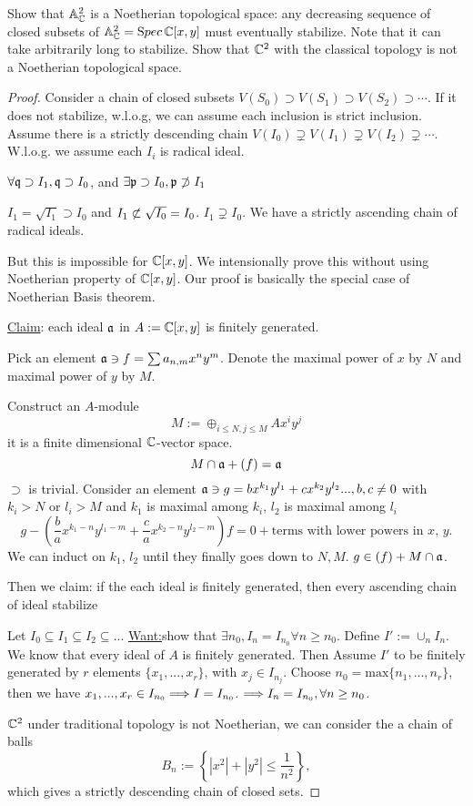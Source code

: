 \documentclass[11pt,fleqn]{book}
\begin{document}
\begin{exr}
Show that $\mathbb A^2_\mathbb C$ is a Noetherian topological space: any decreasing sequence of closed subsets of $\mathbb A^2_\mathbb C = {\text Spec\,} \mathbb C[x, y]$ must eventually stabilize. Note that it can take arbitrarily long to stabilize.  Show that $\mathbb C^2$ with the classical topology is not a Noetherian topological space.
\end{exr}
\begin{proof}
Consider a chain of closed subsets $V(S_0)\supset V(S_1)\supset V(S_2)\supset \cdots $. If it does not stabilize, w.l.o.g, we can assume each inclusion is strict inclusion. Assume there is a strictly descending chain $V(I_0)\supsetneq V(I_1)\supsetneq V(I_2)\supsetneq \cdots$. W.l.o.g. we assume each $I_i$ is radical ideal.

$\forall \mathfrak q\supset I_1, \mathfrak q\supset I_0$, and $\exists {\mathfrak p}\supset I_0, {\mathfrak p}\not \supset I_1$

$
I_1=\sqrt{I_1}\supset I_0
$
and $I_1\not \subset \sqrt{I_0}=I_0$. $I_1\supsetneq I_0$. We have a strictly ascending chain of radical ideals.

But this is impossible for $\mathbb C[x,y]$. We intensionally prove this without using Noetherian property of $\mathbb C[x,y]$. Our proof is basically the special case of Noetherian Basis theorem.

\underline{Claim}: each ideal ${\mathfrak a}$ in $A:=\mathbb C[x,y]$ is finitely generated.

Pick an element ${\mathfrak a}\ni f=\sum a_{n,m} x^ny^m$. Denote the maximal power of $x$ by $N$ and maximal power of $y$ by $M$.

Construct an $A$-module 
$$
M:=\oplus_{i\leq N,j\leq M}Ax^i y^j
$$
it is a finite dimensional $\mathbb C$-vector space.
$$
M\cap {\mathfrak a}+(f)={\mathfrak a}
$$
$\supset$ is trivial.
Consider an element ${\mathfrak a}\ni g=bx^{k_1}y^{l_1}+cx^{k_2}y^{l_2}...,b,c\neq 0$ with $k_i>N$ or $l_i>M$ and $k_1$ is maximal among $k_i$, $l_2$ is maximal among $l_i$
$$
g-\left(\frac{b}{a}x^{k_1-n}y^{l_1-m}+\frac{c}{a}x^{k_2-n}y^{l_2-m}\right)f=0+\text{terms with lower powers in $x$, $y$}.
$$
We can induct on $k_1$, $l_2$ until they finally goes down to $N,M$. $g\in (f)+M\cap{\mathfrak a}$.

Then we claim: if the each ideal is finitely generated, then every ascending chain of ideal stabilize

Let $I_0\subseteq I_1\subseteq I_2\subseteq ...$ \underline{Want:}show that $\exists n_0,I_n=I_{n_0}\forall n\geq n_0$.
Define $I':=\cup_n I_n$. We know that every ideal of ${A}$ is finitely generated. Then Assume $I'$ to be finitely generated by $r$ elements $\{x_1,...,x_r\}$, with $x_j\in I_{n_j}$. Choose $n_0=\text{max}\{n_1,...,n_r\}$, then we have $x_1,...,x_r\in I_{n_0}\Longrightarrow I=I_{n_0}$. $\Longrightarrow I_n=I_{n_0},\forall n\geq n_0$.

$\mathbb C^2$ under traditional topology is not Noetherian, we can consider the a chain of balls
$$
B_n:=\left\{|x^2|+|y^2|\leq \frac{1}{n^2}\right\},
$$
which gives a strictly descending chain of closed sets.
\end{proof}
\end{document}
